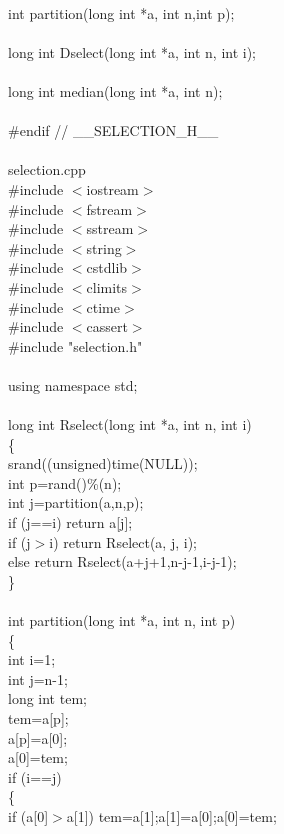\documentclass{article}
\begin{document}
\\
int partition(long int *a, int n,int p);\\
\\
long int Dselect(long int *a, int n, int i);\\
\\
long int median(long int *a, int n);\\
\\
\#endif // \_\_SELECTION\_H\_\_\\
\\
selection.cpp\\
\#include $<$iostream$>$\\
\#include $<$fstream$>$\\
\#include $<$sstream$>$\\
\#include $<$string$>$\\
\#include $<$cstdlib$>$\\
\#include $<$climits$>$\\
\#include $<$ctime$>$\\
\#include $<$cassert$>$\\
\#include "selection.h"\\
\\
using namespace std;\\
\\
long int Rselect(long int *a, int n, int i)\\
\{\\
    srand((unsigned)time(NULL));\\
    int p=rand()\%(n);\\
    int j=partition(a,n,p);\\
    if (j==i) return a[j];\\
    if (j$>$i) return Rselect(a, j, i);\\
    else return Rselect(a+j+1,n-j-1,i-j-1);\\
\}\\
\\
int partition(long int *a, int n, int p)\\
\{\\
    int i=1;\\
    int j=n-1;\\
    long int tem;\\
    tem=a[p];\\
    a[p]=a[0];\\
    a[0]=tem;\\
    if (i==j)\\
    \{\\
        if (a[0]$>$a[1]) {tem=a[1];a[1]=a[0];a[0]=tem;}\\
\end{document}

